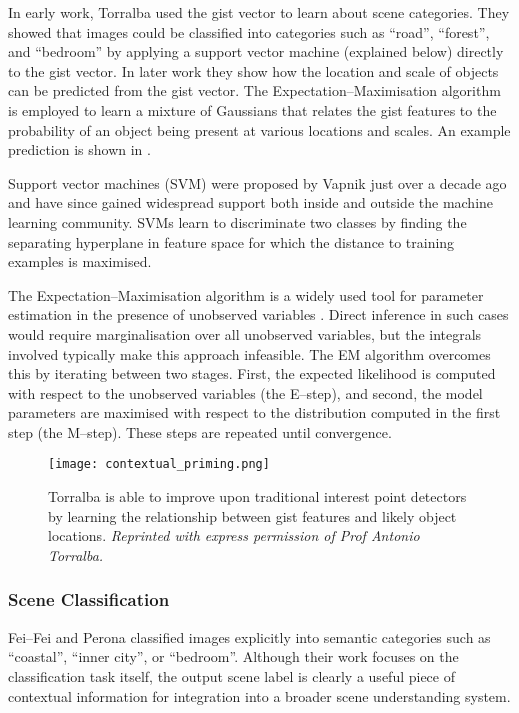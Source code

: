 In early work, Torralba \etal used the gist vector to learn about
scene categories. They showed that images could be classified into
categories such as ``road'', ``forest'', and ``bedroom'' by applying a
support vector machine (explained below) directly to the gist
vector. In later work \cite{Torralba03} they show how the location and
scale of objects can be predicted from the gist vector. The
Expectation--Maximisation algorithm \cite{Dempster77} is employed
to learn a mixture of Gaussians that relates the gist features to the
probability of an object being present at various locations and
scales. An example prediction is shown in .

Support vector machines (SVM) were proposed by Vapnik \cite{Vapnik95}
just over a decade ago and have since gained widespread support both
inside and outside the machine learning community. SVMs learn to
discriminate two classes by finding the separating hyperplane in
feature space for which the distance to training examples is
maximised.

The Expectation--Maximisation algorithm is a widely used tool for
parameter estimation in the presence of unobserved variables
\cite{Dempster77}. Direct inference in such cases would require
marginalisation over all unobserved variables, but the integrals
involved typically make this approach infeasible. The EM algorithm
overcomes this by iterating between two stages. First, the expected
likelihood is computed with respect to the unobserved variables (the
E--step), and second, the model parameters are maximised with respect
to the distribution computed in the first step (the M--step). These
steps are repeated until convergence.

\begin{figure}[tb]
\centering
\texttt{[image: contextual\_priming.png]}
\caption{Torralba \etal \cite{Torralba03} is able to improve upon
  traditional interest point detectors by learning the relationship
  between gist features and likely object locations. 
  \textit{Reprinted with express permission of Prof Antonio Torralba.}
  }
\label{fig:contextual-priming}
\end{figure}

\subsubsection{Scene Classification}

Fei--Fei and Perona \cite{Fei-fei05} classified images
explicitly into semantic categories such as ``coastal'', ``inner
city'', or ``bedroom''. Although their work focuses on the
classification task itself, the output scene label is clearly a useful
piece of contextual information for integration into a broader scene
understanding system.


